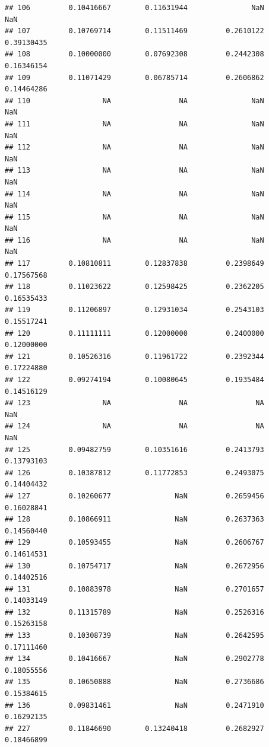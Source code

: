 \documentclass[]{article}
\begin{document}
\begin{verbatim}
## 106         0.10416667        0.11631944               NaN                 NaN
## 107         0.10769714        0.11511469         0.2610122          0.39130435
## 108         0.10000000        0.07692308         0.2442308          0.16346154
## 109         0.11071429        0.06785714         0.2606862          0.14464286
## 110                 NA                NA               NaN                 NaN
## 111                 NA                NA               NaN                 NaN
## 112                 NA                NA               NaN                 NaN
## 113                 NA                NA               NaN                 NaN
## 114                 NA                NA               NaN                 NaN
## 115                 NA                NA               NaN                 NaN
## 116                 NA                NA               NaN                 NaN
## 117         0.10810811        0.12837838         0.2398649          0.17567568
## 118         0.11023622        0.12598425         0.2362205          0.16535433
## 119         0.11206897        0.12931034         0.2543103          0.15517241
## 120         0.11111111        0.12000000         0.2400000          0.12000000
## 121         0.10526316        0.11961722         0.2392344          0.17224880
## 122         0.09274194        0.10080645         0.1935484          0.14516129
## 123                 NA                NA                NA                 NaN
## 124                 NA                NA                NA                 NaN
## 125         0.09482759        0.10351616         0.2413793          0.13793103
## 126         0.10387812        0.11772853         0.2493075          0.14404432
## 127         0.10260677               NaN         0.2659456          0.16028841
## 128         0.10866911               NaN         0.2637363          0.14560440
## 129         0.10593455               NaN         0.2606767          0.14614531
## 130         0.10754717               NaN         0.2672956          0.14402516
## 131         0.10883978               NaN         0.2701657          0.14033149
## 132         0.11315789               NaN         0.2526316          0.15263158
## 133         0.10308739               NaN         0.2642595          0.17111460
## 134         0.10416667               NaN         0.2902778          0.18055556
## 135         0.10650888               NaN         0.2736686          0.15384615
## 136         0.09831461               NaN         0.2471910          0.16292135
## 227         0.11846690        0.13240418         0.2682927          0.18466899

\end{verbatim}
\end{document}
